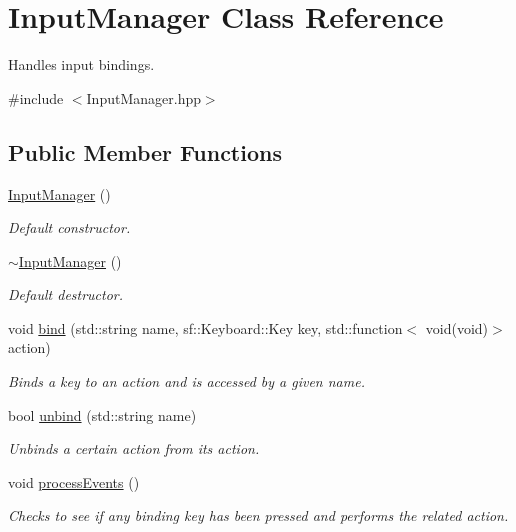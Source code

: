 \hypertarget{class_input_manager}{}\section{Input\+Manager Class Reference}
\label{class_input_manager}


Handles input bindings.  




{\ttfamily \#include $<$Input\+Manager.\+hpp$>$}

\subsection*{Public Member Functions}
\begin{DoxyCompactItemize}
\item 
\mbox{\label{class_input_manager_a8be46886da639b26d67181c29dab6d6c}} 
\mbox{\hyperlink{class_input_manager_a8be46886da639b26d67181c29dab6d6c}{Input\+Manager}} ()
\begin{DoxyCompactList}\small\item\em Default constructor. \end{DoxyCompactList}\item 
\mbox{\label{class_input_manager_af518290877dd183606709d5852db5491}} 
\mbox{\hyperlink{class_input_manager_af518290877dd183606709d5852db5491}{$\sim$\+Input\+Manager}} ()
\begin{DoxyCompactList}\small\item\em Default destructor. \end{DoxyCompactList}\item 
void \mbox{\hyperlink{class_input_manager_ab273491eb52d4e8e592b29fc0a83a854}{bind}} (std\+::string name, sf\+::\+Keyboard\+::\+Key key, std\+::function$<$ void(void)$>$ action)
\begin{DoxyCompactList}\small\item\em Binds a key to an action and is accessed by a given name. \end{DoxyCompactList}\item 
bool \mbox{\hyperlink{class_input_manager_a1a222ff5d80067251a4e11c35a4cb862}{unbind}} (std\+::string name)
\begin{DoxyCompactList}\small\item\em Unbinds a certain action from its action. \end{DoxyCompactList}\item 
\mbox{\label{class_input_manager_a01135fd4977633bdbe61c4a864f0cb54}} 
void \mbox{\hyperlink{class_input_manager_a01135fd4977633bdbe61c4a864f0cb54}{process\+Events}} ()
\begin{DoxyCompactList}\small\item\em Checks to see if any binding key has been pressed and performs the related action. \end{DoxyCompactList}\end{DoxyCompactItemize}


